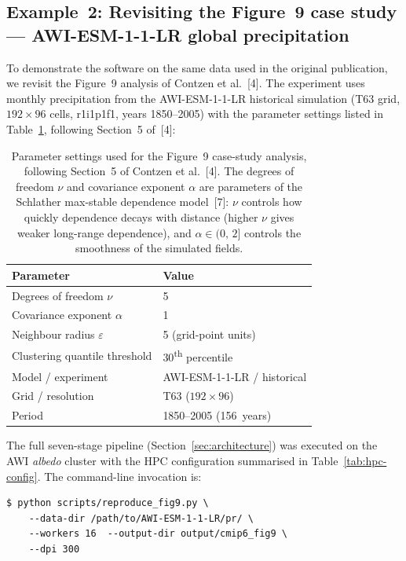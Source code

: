 \documentclass[preprint,12pt,a4paper]{elsarticle}
\newcommand{\rev}[1]{{#1}}
\newcommand{\revb}[1]{{\color{RevisionBlue}#1}}
\newcommand{\revo}[1]{{\color{RevisionOrange}#1}}
\begin{document}
\FloatBarrier

\rev{\subsection{Example~2: \revb{Revisiting the Figure~9 case study} --- AWI-ESM-1-1-LR
  global precipitation}}
\label{sec:ex-fig9}

\rev{To demonstrate the software on the same data used in the original
publication, we \revb{revisit the Figure~9 analysis} of Contzen et al.~[4].  The
experiment uses monthly precipitation from the AWI-ESM-1-1-LR
historical simulation (T63 grid, $192 \times 96$ cells, r1i1p1f1,
years 1850--2005) with the parameter settings listed in
Table~\ref{tab:fig9-params}, following Section~5 of~[4]:}

\begin{table}[ht]
\centering
\begin{tabular}{ll}
\toprule
\textbf{Parameter} & \textbf{Value} \\
\midrule
Degrees of freedom $\nu$ & 5 \\
Covariance exponent $\alpha$ & 1 \\
Neighbour radius $\varepsilon$ & 5 (grid-point units) \\
Clustering quantile threshold & 30\textsuperscript{th} percentile \\
Model / experiment & AWI-ESM-1-1-LR / historical \\
Grid / resolution & T63 ($192 \times 96$) \\
Period & 1850--2005 (156~years) \\
\bottomrule
\end{tabular}
\caption{Parameter settings used for the Figure~9 \revb{case-study analysis},
  following Section~5 of Contzen et al.~[4]. \revo{The degrees of
  freedom $\nu$ and covariance exponent $\alpha$ are parameters of
  the Schlather max-stable dependence model~[7]: $\nu$ controls
  how quickly dependence decays with distance (higher $\nu$ gives
  weaker long-range dependence), and $\alpha \in (0,\,2]$
  controls the smoothness of the simulated fields.}}
\label{tab:fig9-params}
\end{table}

\rev{The full seven-stage pipeline (Section~\ref{sec:architecture}) was
executed on the AWI \emph{albedo} cluster with the HPC configuration
summarised in Table~\ref{tab:hpc-config}. The command-line invocation is:}

\begin{lstlisting}[caption={\revb{Running the Figure~9 case study on HPC}.},
  label=lst:fig9, numbers=none]
$ python scripts/reproduce_fig9.py \
    --data-dir /path/to/AWI-ESM-1-1-LR/pr/ \
    --workers 16  --output-dir output/cmip6_fig9 \
    --dpi 300
\end{lstlisting}
\end{document}
